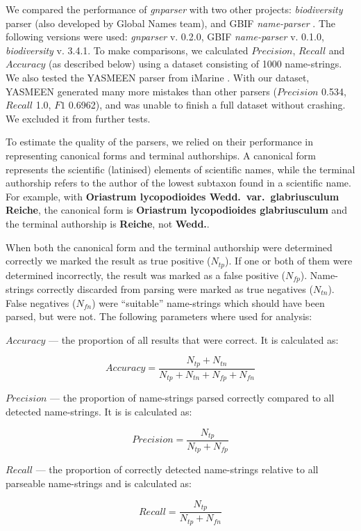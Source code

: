 \documentclass{bmcart}
\begin{document}
We compared the performance of \textit{gnparser} with two other projects: \textit{biodiversity} parser \cite{Boyle2013, biodiversity} (also developed by Global Names team), and GBIF \textit{name-parser} \cite{gbifNameParser}. The following versions were used: \textit{gnparser} v.  0.2.0, GBIF \textit{name-parser} v. 0.1.0, \textit{biodiversity} v. 3.4.1. To make comparisons, we calculated $Precision$, $Recall$ and $Accuracy$ (as described below) using a dataset consisting of 1000 name-strings. We also tested the YASMEEN parser from iMarine \cite{VandenBerghe2015}. With our dataset, YASMEEN generated many more mistakes than other parsers ($Precision$ 0.534, $Recall$ 1.0, $F1$ 0.6962), and was unable to finish a full dataset without crashing. We excluded it from further tests.

To estimate the quality of the parsers, we relied on their performance in representing canonical forms and terminal authorships. A canonical form represents the scientific (latinised) elements of scientific names, while the terminal authorship refers to the author of the lowest subtaxon found in a scientific name. For example, with \textbf{Oriastrum lycopodioides Wedd.\ var.\ glabriusculum Reiche}, the canonical form is \textbf{Oriastrum lycopodioides glabriusculum} and the terminal authorship is \textbf{Reiche}, not \textbf{Wedd.}.

When both the canonical form and the terminal authorship were determined correctly we marked the result as true positive ($N_{tp}$). If one or both of them were determined incorrectly, the result was marked as a false positive ($N_{fp}$). Name-strings correctly discarded from parsing were marked as true negatives ($N_{tn}$). False negatives ($N_{fn}$) were ``suitable'' name-strings which should have been parsed, but were not. The following parameters where used for analysis:

$Accuracy$ --- the proportion of all results that were correct. It is calculated as:

\[Accuracy = \dfrac{N_{tp} + N_{tn}}{N_{tp} + N_{tn} + N_{fp} + N_{fn}}\]

$Precision$ --- the proportion of name-strings parsed correctly compared to all detected name-strings. It is is calculated as:

\[Precision = \dfrac{N_{tp}}{N_{tp} + N_{fp}}\]

$Recall$ --- the proportion of correctly detected name-strings relative to all parseable name-strings and is calculated as:

\[Recall = \dfrac{N_{tp}}{N_{tp} + N_{fn}}\]
\end{document}
